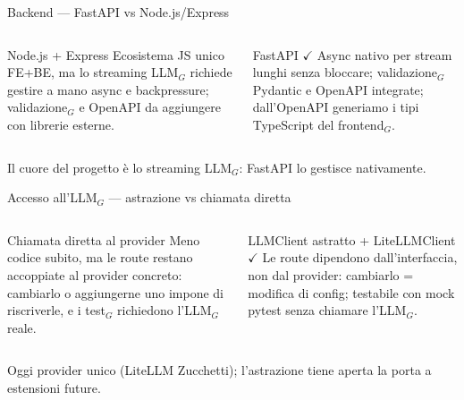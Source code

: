 \documentclass[aspectratio=169,11pt]{beamer}
\newenvironment{scelto}[1]{\begin{alertblock}{#1}}{\end{alertblock}}
\begin{document}
\begin{frame}{Backend --- FastAPI vs Node.js/Express}
  \begin{columns}[T]
    \begin{block}{Node.js + Express}
      {\small Ecosistema JS unico FE+BE, ma lo streaming LLM$_G$ richiede gestire a mano async e backpressure; validazione$_G$ e OpenAPI da aggiungere con librerie esterne.}
    \end{block}
    \begin{scelto}{FastAPI \ensuremath{\checkmark}}
      {\small Async nativo per stream lunghi senza bloccare; validazione$_G$ Pydantic e OpenAPI integrate; dall'OpenAPI generiamo i tipi TypeScript del frontend$_G$.}
    \end{scelto}
  \end{columns}
  \vspace{6pt}
  \begin{center}
    {\color{sbnavy}\small Il cuore del progetto è lo streaming LLM$_G$: FastAPI lo gestisce nativamente.}
  \end{center}
\end{frame}

\begin{frame}{Accesso all'LLM$_G$ --- astrazione vs chiamata diretta}
  \begin{columns}[T]
    \begin{block}{Chiamata diretta al provider}
      {\small Meno codice subito, ma le route restano accoppiate al provider concreto: cambiarlo o aggiungerne uno impone di riscriverle, e i test$_G$ richiedono l'LLM$_G$ reale.}
    \end{block}
    \begin{scelto}{LLMClient astratto + LiteLLMClient \ensuremath{\checkmark}}
      {\small Le route dipendono dall'interfaccia, non dal provider: cambiarlo = modifica di config; testabile con mock pytest senza chiamare l'LLM$_G$.}
    \end{scelto}
  \end{columns}
  \vspace{6pt}
  {\small\color{sbgray} Oggi provider unico (LiteLLM Zucchetti); l'astrazione tiene aperta la porta a estensioni future.}
\end{frame}
\end{document}
